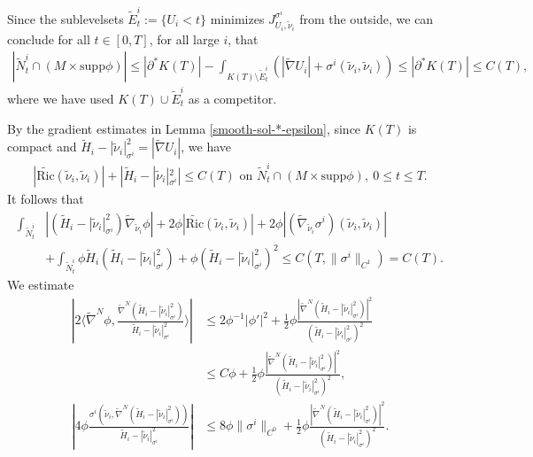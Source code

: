 \documentclass[11pt, letterpaper]{amsart}
\theoremstyle{definition}
\theoremstyle{remark}
\begin{document}
Since the sublevelsets $\tilde{E}^{i}_{t} := \{ U_i < t\}  $ minimizes $J^{\sigma ^{i}}_{U_i, \tilde{\nu }_i}$ from the outside, we can conclude for all $t \in [0, T]$, for all large $i$, that
\begin{align}\label{N_t-area-bound-C(T)}
	| \tilde{N}^{i}_{t} \cap (M \times \mathrm{supp} \phi )| \leq |\partial ^* K(T)| - \int_{K(T) \setminus \tilde{E}^{i}_t} \left( |\tilde{\nabla }U_i|+ \sigma ^{i}(\tilde{\nu }_i, \tilde{\nu }_i) \right) \leq |\partial ^* K(T)| \leq C(T),
\end{align} 
where we have used $K(T) \cup \tilde{E}^{i}_{t}$ as a competitor. 


By the gradient estimates in Lemma \ref{smooth-sol-*-epsilon}, since $K(T)$ is compact and $\tilde{H}_i - |\tilde{\nu }_i|^2_{\sigma ^{i}}=|\tilde{\nabla }U_i|$, we have
\begin{align*}
	|\tilde{\mathrm{Ric}}(\tilde{\nu }_i, \tilde{\nu }_i)|+ | \tilde{H}_i -|\tilde{\nu }_i|^2_{\sigma ^{i}} | \leq C(T) \text{ on } \tilde{N}^{i}_t \cap (M \times \mathrm{supp}\phi ),\ 0 \leq t \leq T.
\end{align*} 
It follows that
\begin{align*}
	\int_{\tilde{N}^{i}_t}  &|(\tilde{H}_{i}-|\tilde{\nu}_i |^2_{\sigma ^{i} }) \tilde{\nabla} _{\tilde{\nu}_i }\phi |  + 2\phi |\tilde{\mathrm{Ric}}(\tilde{\nu }_i, \tilde{\nu }_i)|+ 2\phi |(\tilde{\nabla }_{\tilde{\nu }_i}\sigma ^{i})(\tilde{\nu }_i, \tilde{\nu }_i)| \\
 &+ \int_{\tilde{N}^{i}_{t}}  \phi \tilde{H}_i(\tilde{H}_i - |\tilde{\nu }_i|^2_{\sigma ^{i}}) + \phi (\tilde{H}_i - |\tilde{\nu }_i|^2_{\sigma ^{i}}) ^2 \leq C(T, \|\sigma ^{i}\|_{C^1}) = C(T).
\end{align*} 
We estimate
\begin{align*}
	\left| 2\langle \tilde{\nabla} ^{N} \phi , \frac{\tilde{\nabla} ^{N}(\tilde{H}_i-|\tilde{\nu}_i |^2_{\sigma^{i} })}{\tilde{H}_i- |\tilde{\nu}_i |^2_{\sigma ^{i} }} \rangle \right| & \leq 2 \phi ^{-1}|\phi '|^2+ \frac{1}{2} \phi \frac{|\tilde{\nabla} ^{N}(\tilde{H}_i-|\tilde{\nu}_i |^2_{\sigma^{i} })|^2}{(\tilde{H}_i- |\tilde{\nu}_i |^2_{\sigma ^{i} })^2}\\
																							    &\leq C \phi + \frac{1}{2} \phi \frac{|\tilde{\nabla} ^{N}(\tilde{H}_i-|\tilde{\nu}_i |^2_{\sigma^{i} })|^2}{(\tilde{H}_i- |\tilde{\nu}_i |^2_{\sigma ^{i} })^2},\\
	\left|4 \phi \frac{\sigma ^{i}( \tilde{\nu}_i , \tilde{\nabla} ^{N}(\tilde{H}_i- |\tilde{\nu}_i |^2_{\sigma^{i} }) )}{\tilde{H}_i- |\tilde{\nu}_i |^2_{\sigma ^{i}}} \right| &\leq 8 \phi \|\sigma ^{i}\|_{C^0}+ \frac{1}{2} \phi \frac{|\tilde{\nabla} ^{N}(\tilde{H}_i-|\tilde{\nu}_i |^2_{\sigma^{i} })|^2}{(\tilde{H}_i- |\tilde{\nu}_i |^2_{\sigma ^{i} })^2}.
\end{align*} 
\end{document}
